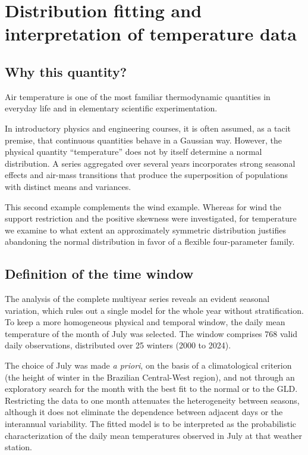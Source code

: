 \section{Distribution fitting and interpretation of temperature data}\label{sec:temperatura}

\subsection{Why this quantity?}

Air temperature is one of the most familiar thermodynamic quantities in everyday life and in elementary scientific experimentation.

In introductory physics and engineering courses, it is often assumed, as a tacit premise, that continuous quantities behave in a Gaussian way. However, the physical quantity ``temperature'' does not by itself determine a normal distribution. A series aggregated over several years incorporates strong seasonal effects and air-mass transitions that produce the superposition of populations with distinct means and variances.

This second example complements the wind example. Whereas for wind the support restriction and the positive skewness were investigated, for temperature we examine to what extent an approximately symmetric distribution justifies abandoning the normal distribution in favor of a flexible four-parameter family.

\subsection{Definition of the time window}

The analysis of the complete multiyear series reveals an evident seasonal variation, which rules out a single model for the whole year without stratification. To keep a more homogeneous physical and temporal window, the daily mean temperature of the month of July was selected. The window comprises $768$ valid daily observations, distributed over 25 winters (2000 to 2024).

The choice of July was made \textit{a priori}, on the basis of a climatological criterion (the height of winter in the Brazilian Central-West region), and not through an exploratory search for the month with the best fit to the normal or to the GLD. Restricting the data to one month attenuates the heterogeneity between seasons, although it does not eliminate the dependence between adjacent days or the interannual variability. The fitted model is to be interpreted as the probabilistic characterization of the daily mean temperatures observed in July at that weather station.

